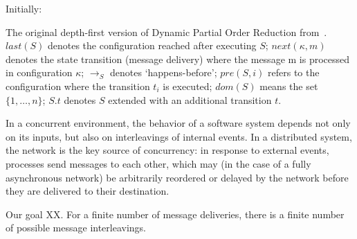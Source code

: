 \begin{algorithm*}[ht!]
{\footnotesize
\begin{algorithmic}
\State Initially: 
\Else
{}
\EndIf
\EndIf
\EndFor

\EndWhile
\EndIf

\EndProcedure
\end{algorithmic}
}
\caption{{\label{alg:dpor} The original depth-first version of Dynamic Partial Order Reduction
from~\cite{flanagan2005dynamic}. $last(S)$ denotes the configuration reached
after executing $S$;
$next(\kappa,m)$ denotes the state transition (message delivery) where the message m is
processed in configuration $\kappa$; $\rightarrow_S$ denotes `happens-before';
$pre(S,i)$ refers to the configuration where the transition $t_i$ is executed; $dom(S)$ means the set
$\{1,\dots,n\}$; $S.t$ denotes
$S$ extended with an additional transition $t$.}}
\end{algorithm*}

In a concurrent environment, the behavior of a software system depends not only on
its inputs, but also on interleavings of internal events. In a distributed
system, the network is the key source of concurrency: in response to external
events, processes send messages to each other, which may (in the case of a
fully asynchronous network) be arbitrarily
reordered or delayed by the network before they are delivered to their
destination.

Our goal XX.
For a finite number of message deliveries, there is a finite number of
possible message interleavings.

